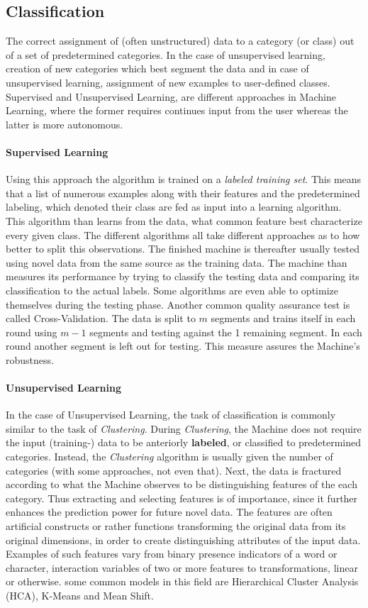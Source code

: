 	\subsection{Classification}
		The correct assignment of (often unstructured) data to a category (or class) out of a set of predetermined categories. In the case of unsupervised learning, creation of new categories which best segment the data and in case of unsupervised learning, assignment of new examples to user-defined classes. Supervised and Unsupervised Learning, are different approaches in Machine Learning, where the former requires continues input from the user whereas the latter is more autonomous. 
		
		\paragraph{Supervised Learning}
		Using this approach the algorithm is trained on a \textit{labeled training set}. This means that a list of numerous examples along with their features and the predetermined labeling, which denoted their class are fed as input into a learning algorithm. This algorithm than learns from the data, what common feature best characterize every given class. The different algorithms all take different approaches as to how better to split this observations. The finished machine is thereafter usually tested using novel data from the same source as the training data. The machine than measures its performance by trying to classify the testing data and comparing its classification to the actual labels. Some algorithms are even able to optimize themselves during the testing phase. Another common quality assurance test is called Cross-Validation. The data is split to $ m $ segments and trains itself in each round using $ m-1 $ segments and testing against the 1 remaining segment. In each round another segment is left out for testing. This measure assures the Machine's robustness.
		
		\paragraph{Unsupervised Learning}
		In the case of Unsupervised Learning, the task of classification is commonly similar to the task of \textit{Clustering}. During \textit{Clustering}, the Machine does not require the input (training-) data to be anteriorly \textbf{labeled}, or classified to predetermined categories. Instead, the \textit{Clustering} algorithm is usually given the number of categories (with some approaches, not even that). Next, the data is fractured according to what the Machine observes to be distinguishing features of the each category. Thus extracting and selecting features is of importance, since it further enhances the prediction power for future novel data. The features are often artificial constructs or rather functions transforming the original data from its original dimensions, in order to create distinguishing attributes of the input data. Examples of such features vary from binary presence indicators of a word or character, interaction variables of two or more features to transformations, linear or otherwise. some  common models in this field are Hierarchical Cluster Analysis (HCA), K-Means and Mean Shift.
		
